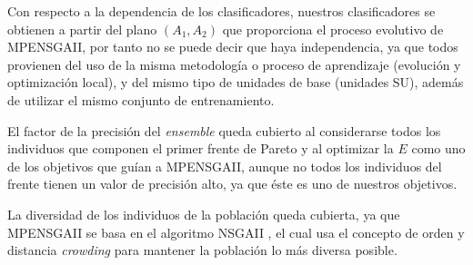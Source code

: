 Con respecto a la dependencia de los clasificadores, nuestros clasificadores se obtienen a
partir del plano $(A_{1},A_{2})$ que proporciona el proceso evolutivo de MPENSGAII, por
tanto no se puede decir que haya independencia, ya que todos provienen del uso de la misma
metodología o proceso de aprendizaje (evolución y optimización local), y del mismo tipo de
unidades de base (unidades SU), además de utilizar el mismo conjunto de entrenamiento.

El factor de la precisión del \textit{ensemble} queda cubierto al considerarse todos los
individuos que componen el primer frente de Pareto y al optimizar la $E$ como uno de los objetivos
que guían a MPENSGAII, aunque no todos los individuos del
frente tienen un valor de precisión alto, ya que éste es uno de nuestros objetivos.

%

La diversidad de los individuos de la población queda cubierta, ya que MPENSGAII
se basa en el algoritmo NSGAII \cite{Deb2004}, el cual usa el concepto de orden
y distancia \textit{crowding} para mantener la población lo más diversa posible.


